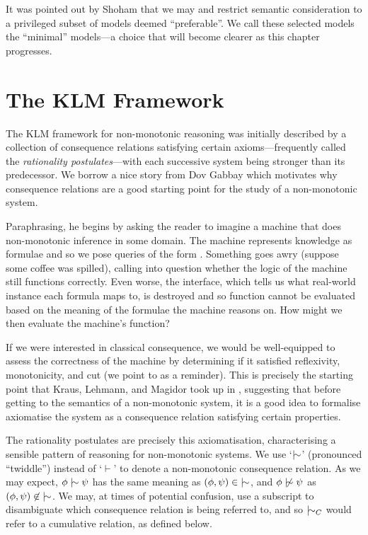 It was pointed out by Shoham \cite{shohamSemanticApproach} that we may  and restrict semantic consideration
to a privileged subset of models deemed ``preferable''. We call these selected models the ``minimal'' models---a choice
that will become clearer as this chapter progresses.

\section{The KLM Framework}
The KLM framework for non-monotonic reasoning was initially described by a collection of consequence relations
satisfying certain axioms---frequently called the \textit{rationality postulates}---with each successive system being stronger
than its predecessor. We borrow a nice story from Dov Gabbay \cite{gabbay1985theoreticalFoundations} which motivates why
consequence relations are a good starting point for the study of a non-monotonic system.

Paraphrasing, he begins by asking the reader to imagine a machine that does non-monotonic inference in some domain. The
machine represents knowledge as formulae and so we pose queries of the form .
Something goes awry (suppose some coffee was spilled), calling into question whether the logic of the machine still functions
correctly. Even worse, the interface, which tells us what real-world instance each formula maps to, is destroyed and so function
cannot be evaluated based on the meaning of the formulae the machine reasons on. How might we then evaluate the machine's
function?

If we were interested in classical consequence, we would be well-equipped to assess the correctness of the machine by determining
if it satisfied reflexivity, monotonicity, and cut (we point to  as a reminder).
This is precisely the starting point that Kraus, Lehmann, and Magidor took up in \cite{kraus1990nonmonotonic}, suggesting
that before getting to the semantics of a non-monotonic system, it is a good idea to formalise axiomatise the system as
a consequence relation satisfying certain properties.

The rationality postulates are precisely this axiomatisation, characterising a sensible pattern of reasoning for non-monotonic
systems. We use `$\twiddle$' (pronounced ``twiddle'') instead of `$\vdash$' to denote a non-monotonic consequence
relation. As we may expect, $\phi \twiddle \psi$ has the same meaning as $(\phi, \psi) \in \; \twiddle$, and $\phi \ntwiddle
\psi$ as $(\phi, \psi)\not \in \; \twiddle$. We may, at times of potential confusion, use a subscript to disambiguate
which consequence relation is being referred to, and so $\twiddle_{C}$ would refer to a cumulative relation, as defined
below.

